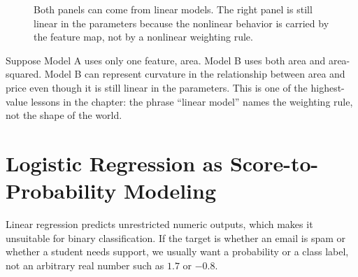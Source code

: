 \begin{figure}[t]
\centering
{}
\caption{Both panels can come from linear models. The right panel is still linear in the parameters because the nonlinear behavior is carried by the feature map, not by a nonlinear weighting rule.}
\label{fig:linear-in-parameters}
\end{figure}

Suppose Model A uses only one feature, area. Model B uses both area and area-squared. Model B can represent curvature in the relationship between area and price even though it is still linear in the parameters. This is one of the highest-value lessons in the chapter: the phrase ``linear model'' names the weighting rule, not the shape of the world.

\section{Logistic Regression as Score-to-Probability Modeling}

Linear regression predicts unrestricted numeric outputs, which makes it unsuitable for binary classification. If the target is whether an email is spam or whether a student needs support, we usually want a probability or a class label, not an arbitrary real number such as $1.7$ or $-0.8$.

